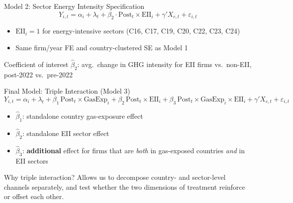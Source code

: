 \documentclass[10pt]{beamer}
\begin{document}
\begin{frame}{Model 2: Sector Energy Intensity Specification}
  \begin{equation}
    Y_{i,t} = \alpha_i + \lambda_t + \beta_2 \cdot \text{Post}_t \times \text{EII}_i + \gamma' X_{c,t} + \varepsilon_{i,t}
  \end{equation}

  \vspace{0.3em}

  \begin{itemize}
    \item $\text{EII}_i = 1$ for energy-intensive sectors (C16, C17, C19, C20, C22, C23, C24)
    \item Same firm/year FE and country-clustered SE as Model 1
  \end{itemize}

  \vspace{0.4em}

  \begin{block}{Coefficient of interest}
    \small $\hat\beta_2$: avg.\ change in GHG intensity for EII firms vs.\ non-EII, post-2022 vs.\ pre-2022
  \end{block}
\end{frame}


\begin{frame}{Final Model: Triple Interaction (Model 3)}
  \small
  \begin{equation}
    Y_{i,t} = \alpha_i + \lambda_t
      + \beta_1 \, \text{Post}_t \times \text{GasExp}_i
      + \beta_2 \, \text{Post}_t \times \text{EII}_i
      + \beta_3 \, \text{Post}_t \times \text{GasExp}_i \times \text{EII}_i
      + \gamma' X_{c,t} + \varepsilon_{i,t}
  \end{equation}

  \normalsize\vspace{0.3em}

  \begin{itemize}
    \item $\hat\beta_1$: standalone country gas-exposure effect
    \item $\hat\beta_2$: standalone EII sector effect
    \item $\hat\beta_3$: \textbf{additional} effect for firms that are \emph{both}
          in gas-exposed countries \emph{and} in EII sectors
  \end{itemize}

  \vspace{0.3em}

  \begin{block}{Why triple interaction?}
    Allows us to decompose country- and sector-level channels separately,
    and test whether the two dimensions of treatment reinforce or offset each other.
  \end{block}
\end{frame}
\end{document}
